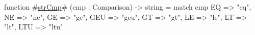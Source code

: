 function #\hyperref[sailMIPSzstrCmp]{strCmp}# (cmp : Comparison) -> string = match cmp {
  EQ  => "eq",
  NE  => "ne",
  GE  => "ge",
  GEU => "geu",
  GT  => "gt",
  LE  => "le",
  LT  => "lt",
  LTU => "ltu"
}
